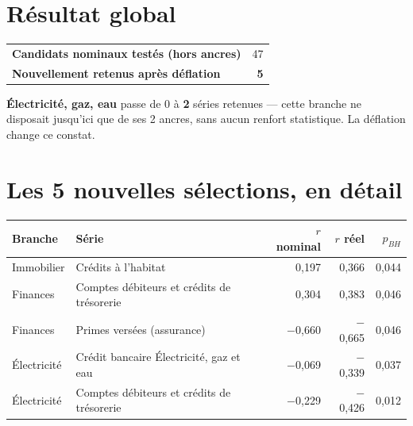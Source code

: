 \documentclass[11pt,a4paper]{article}
\begin{document}
\section{Résultat global}

\begin{fichebox}
\begin{center}
\begin{tabular}{lr}
\toprule
\textbf{Candidats nominaux testés (hors ancres)} & 47 \\
\textbf{Nouvellement retenus après déflation} & \textbf{5} \\
\bottomrule
\end{tabular}
\end{center}
\end{fichebox}

\begin{alertebox}
\textbf{Électricité, gaz, eau} passe de 0 à \textbf{2} séries retenues --- cette branche ne disposait jusqu'ici que de ses 2 ancres, sans aucun renfort statistique. La déflation change ce constat.
\end{alertebox}

\section{Les 5 nouvelles sélections, en détail}

\begin{fichebox}
\begin{center}
\small
\begin{tabular}{p{3cm}p{5.5cm}rrr}
\toprule
\textbf{Branche} & \textbf{Série} & \textbf{$r$ nominal} & \textbf{$r$ réel} & \textbf{$p_{BH}$} \\
\midrule
Immobilier & Crédits à l'habitat & 0,197 & 0,366 & 0,044 \\
Finances & Comptes débiteurs et crédits de trésorerie & 0,304 & 0,383 & 0,046 \\
Finances & Primes versées (assurance) & $-$0,660 & $-$0,665 & 0,046 \\
Électricité & Crédit bancaire Électricité, gaz et eau & $-$0,069 & $-$0,339 & 0,037 \\
Électricité & Comptes débiteurs et crédits de trésorerie & $-$0,229 & $-$0,426 & 0,012 \\
\bottomrule
\end{tabular}
\end{center}
\end{fichebox}
\end{document}
